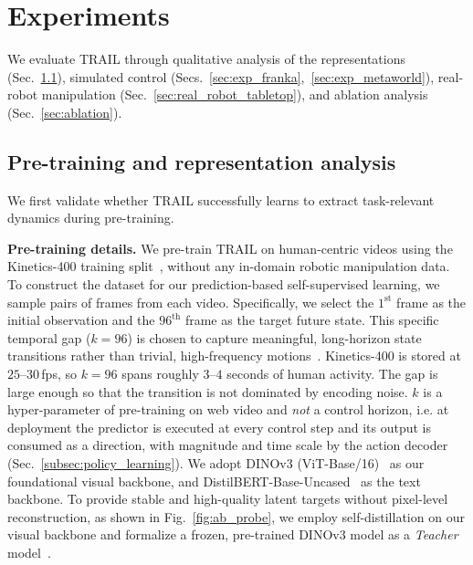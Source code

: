 \section{Experiments}
\label{sec:experiments}
We evaluate TRAIL through qualitative analysis of the representations (Sec.~\ref{sec:exp_visualization}), simulated control (Secs.~\ref{sec:exp_franka},~\ref{sec:exp_metaworld}), real-robot manipulation (Sec.~\ref{sec:real_robot_tabletop}), and ablation analysis (Sec.~\ref{sec:ablation}). 


\subsection{Pre-training and representation analysis}
\label{sec:exp_visualization}
We first validate whether TRAIL successfully learns to extract task-relevant dynamics during pre-training.

\noindent\textbf{Pre-training details.} 
We pre-train TRAIL on human-centric videos using the Kinetics-400 training split~\cite{kay2017kinetics, carreira2017quo}, without any in-domain robotic manipulation data. To construct the dataset for our prediction-based self-supervised learning, we sample pairs of frames from each video. Specifically, we select the $1^{\text{st}}$ frame as the initial observation and the $96^{\text{th}}$ frame as the target future state. This specific temporal gap ($k=96$) is chosen to capture meaningful, long-horizon state transitions rather than trivial, high-frequency motions~\cite{kim2025token}. Kinetics-400 is stored at $25$--$30$\,fps, so $k=96$ spans roughly $3$--$4$ seconds of human activity. The gap is large enough so that the transition is not dominated by encoding noise. $k$ is a hyper-parameter of pre-training on web video and \emph{not} a control horizon, i.e. at deployment the predictor is executed at every control step and its output is consumed as a direction, with magnitude and time scale by the action decoder (Sec.~\ref{subsec:policy_learning}).
We adopt DINOv3 (ViT-Base/16)~\cite{simeoni2025dinov3} as our foundational visual backbone, and DistilBERT-Base-Uncased~\cite{sanh2019distilbert} as the text backbone. To provide stable and high-quality latent targets without pixel-level reconstruction, as shown in Fig.~\ref{fig:ab_probe}, we employ self-distillation on our visual backbone and formalize a frozen, pre-trained DINOv3 model as a  \textit{Teacher} model~\cite{grill2020bootstrap, caron2021emerging}. 

